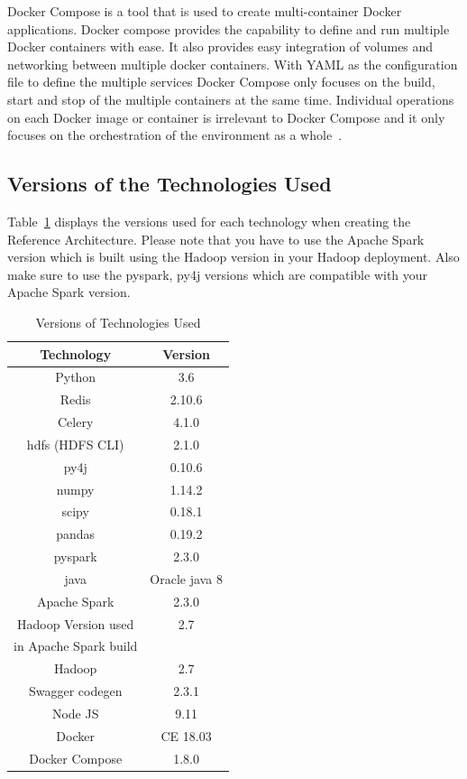 Docker Compose is a tool that is used to create multi-container Docker 
applications. Docker compose provides the capability to define and run 
multiple Docker containers with ease. It also provides easy integration of 
volumes and networking between multiple docker containers. With YAML as the 
configuration file to define the multiple services Docker Compose only focuses 
on the build, start and stop of the multiple containers at the same time. 
Individual operations on each Docker image or container is irrelevant to 
Docker Compose and it only focuses on the orchestration of the environment as 
a whole~\cite{hid-sp18-416-www-docker-compose-blog}. 
	
\subsection{Versions of the Technologies Used}

Table~\ref{tbl:technologyversions} displays the versions used for each 
technology when creating the Reference Architecture. Please note that you have 
to use the Apache Spark version which is built using the Hadoop version in 
your Hadoop deployment. Also make sure to use the pyspark, py4j versions which 
are compatible with your Apache Spark version. 

\begin{table}[htbp]
	\centering
	\caption{Versions of Technologies Used}\label{tbl:technologyversions}
	\begin{tabular}{*{2}{c}}
		\toprule
		Technology & Version \\
		\midrule
		Python & 3.6   \\
		Redis & 2.10.6  \\
		Celery & 4.1.0 \\
		hdfs (HDFS CLI) & 2.1.0 \\
		py4j & 0.10.6 \\
		numpy & 1.14.2  \\
		scipy & 0.18.1  \\
		pandas & 0.19.2  \\
		pyspark & 2.3.0   \\
		java & Oracle java 8 \\
		Apache Spark & 2.3.0 \\
		Hadoop Version used & 2.7 \\
		in Apache Spark build & \\
		Hadoop & 2.7 \\
		Swagger codegen & 2.3.1   \\
		Node JS & 9.11 \\
		Docker & CE 18.03  \\
		Docker Compose & 1.8.0  \\
		\bottomrule
	\end{tabular}
\end{table}

